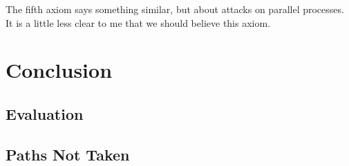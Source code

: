 The fifth axiom says something similar, but about attacks on parallel processes.
It is a little less clear to me that we should believe this axiom.


\section{Conclusion}
\subsection{Evaluation}


\subsection{Paths Not Taken}


